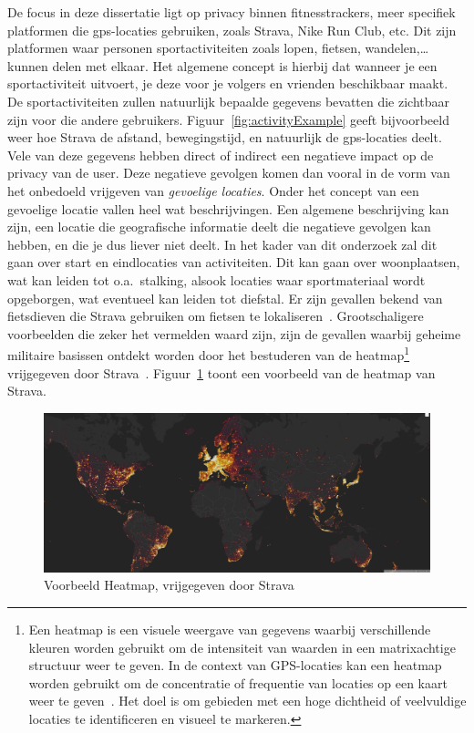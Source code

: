 De focus in deze dissertatie ligt op privacy binnen fitnesstrackers, meer
specifiek platformen die \ac{gps}-locaties gebruiken, zoals Strava, Nike Run
Club, etc. Dit zijn platformen waar personen sportactiviteiten zoals lopen,
fietsen, wandelen,\ldots kunnen delen met elkaar. Het algemene concept is
hierbij dat wanneer je een sportactiviteit uitvoert, je deze voor je volgers en
vrienden beschikbaar maakt. De sportactiviteiten zullen natuurlijk bepaalde
gegevens bevatten die zichtbaar zijn voor die andere gebruikers.
Figuur~\ref{fig:activityExample} geeft bijvoorbeeld weer hoe Strava de afstand,
bewegingstijd, en natuurlijk de \ac{gps}-locaties deelt. Vele van deze gegevens
hebben direct of indirect een negatieve impact op de privacy van de user. Deze
negatieve gevolgen komen dan vooral in de vorm van het onbedoeld vrijgeven van
\textit{gevoelige locaties}. Onder het concept van een gevoelige locatie vallen
heel wat beschrijvingen. Een algemene beschrijving kan zijn, een locatie die
geografische informatie deelt die negatieve gevolgen kan hebben, en die je dus
liever niet deelt. In het kader van dit onderzoek zal dit gaan over start en
eindlocaties van activiteiten. Dit kan gaan over woonplaatsen, wat kan leiden
tot o.a.\ stalking, alsook locaties waar sportmateriaal wordt opgeborgen, wat
eventueel kan leiden tot diefstal. Er zijn gevallen bekend van fietsdieven die
Strava gebruiken om fietsen te lokaliseren~\cite{Sportapp72:online,
    Cyclistw89:online}. Grootschaligere voorbeelden die zeker het vermelden waard
zijn, zijn de gevallen waarbij geheime militaire basissen ontdekt worden door
het bestuderen van de heatmap\footnote{Een heatmap is een visuele weergave van
    gegevens waarbij verschillende kleuren worden gebruikt om de intensiteit van
    waarden in een matrixachtige structuur weer te geven. In de context van
    GPS-locaties kan een heatmap worden gebruikt om de concentratie of frequentie
    van locaties op een kaart weer te geven~\cite{Whatishe21:online}. Het doel is
    om gebieden met een hoge dichtheid of veelvuldige locaties te identificeren en
    visueel te markeren.} vrijgegeven door Strava~\cite{Fitnesst33:online}.
Figuur~\ref{fig:heatmap} toont een voorbeeld van de heatmap van Strava.
\begin{figure}
    \centering
    \includegraphics[width=\textwidth]{fig/Heatmap_strava.png}
    \caption{Voorbeeld Heatmap, vrijgegeven door Strava~\cite{StravaGl10:online}}\label{fig:heatmap}
\end{figure}
